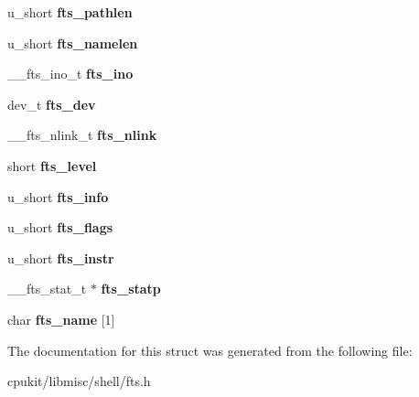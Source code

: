\begin{DoxyCompactItemize}
\mbox{\label{struct__ftsent_a8f8f87adba13caef5a8eba1e5a2755dd}} 
u\+\_\+short {\bfseries fts\+\_\+pathlen}
\item 
\mbox{\label{struct__ftsent_a59ef479bbefa254719b6c023d75d6f88}} 
u\+\_\+short {\bfseries fts\+\_\+namelen}
\item 
\mbox{\label{struct__ftsent_ac5d30b678a862fcbed9b95752a9f385c}} 
\+\_\+\+\_\+fts\+\_\+ino\+\_\+t {\bfseries fts\+\_\+ino}
\item 
\mbox{\label{struct__ftsent_a10be9fd397d6c028092ff401ec353962}} 
dev\+\_\+t {\bfseries fts\+\_\+dev}
\item 
\mbox{\label{struct__ftsent_ac3e79074374ac06fe3344387c8a6fc0e}} 
\+\_\+\+\_\+fts\+\_\+nlink\+\_\+t {\bfseries fts\+\_\+nlink}
\item 
\mbox{\label{struct__ftsent_a43f7f9264e38d10e4281c9a81fca4b00}} 
short {\bfseries fts\+\_\+level}
\item 
\mbox{\label{struct__ftsent_a8055e14f39324a1dfc48a34095aa3578}} 
u\+\_\+short {\bfseries fts\+\_\+info}
\item 
\mbox{\label{struct__ftsent_ad8a7665e5340b6bfeee7524aa11fd50f}} 
u\+\_\+short {\bfseries fts\+\_\+flags}
\item 
\mbox{\label{struct__ftsent_a8b8222cea281b2ee8f96f4338df6f6a8}} 
u\+\_\+short {\bfseries fts\+\_\+instr}
\item 
\mbox{\label{struct__ftsent_a08d9da23362b5906cec86a5cd5029494}} 
\+\_\+\+\_\+fts\+\_\+stat\+\_\+t $\ast$ {\bfseries fts\+\_\+statp}
\item 
\mbox{\label{struct__ftsent_a8b7354c236f5db6e0660f7a47649aca8}} 
char {\bfseries fts\+\_\+name} \mbox{[}1\mbox{]}
\end{DoxyCompactItemize}


The documentation for this struct was generated from the following file\+:\begin{DoxyCompactItemize}
\item 
cpukit/libmisc/shell/fts.\+h\end{DoxyCompactItemize}
